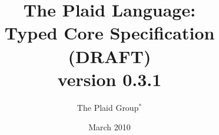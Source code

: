 \documentclass[12pt]{article}
\title{The Plaid Language:\\
Typed Core Specification (DRAFT)\\ %
\vspace{2ex}
version 0.3.1\\
\vspace{2ex}
}
\author{The Plaid Group$^{\ast}$
}
\date{March 2010}
\begin{document}
\renewcommand*{\thepage}{title-\arabic{page}} 
\maketitle
\renewcommand*{\thepage}{\arabic{page}} 







\end{document}
